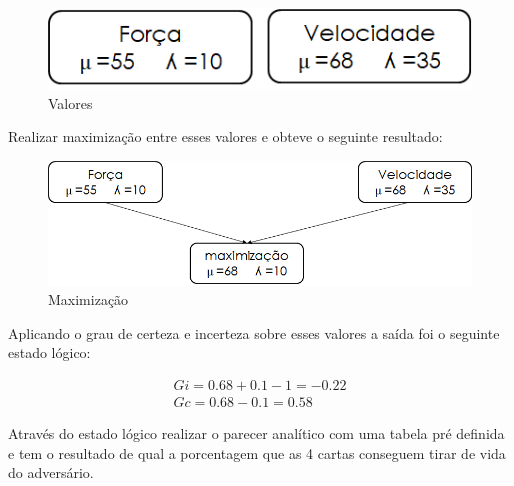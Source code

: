 \begin{figure}[htb]
	\caption{
		\label{fig:forca} 
		Valores
	}
	\begin{center}
		\includegraphics[scale=0.5]{imagens/valores.png}
	\end{center}

\end{figure}

Realizar maximização entre esses valores e obteve o seguinte resultado:

\begin{figure}[htb]
	\caption{
		\label{flg:max}
		Maximização
	}
	\begin{center}
		\includegraphics[scale=0.5]{imagens/max.png}
	\end{center}
\end{figure}

Aplicando o grau de certeza e incerteza sobre esses valores a saída foi o seguinte estado lógico:

\begin{equation*}
	\begin{array}{cc}
	Gi = 0.68 + 0.1 -1 = -0.22 \\
	Gc = 0.68 - 0.1 = 0.58
	\end{array}
\end{equation*}

Através do estado lógico realizar o parecer analítico com uma tabela pré definida e tem o resultado de qual a porcentagem que as 4 cartas conseguem tirar de vida do adversário.

\newpage


